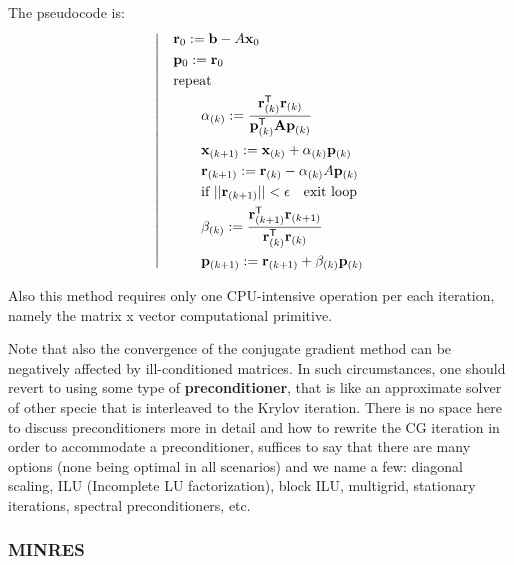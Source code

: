 \documentclass{digitaldynamics}
\def\matr#1{{#1}}
\begin{document}
The pseudocode is:
\begin{align}
\left| \quad
	\begin{aligned}
& \mathbf{r}_0 := \mathbf{b} - \matr{A} \mathbf{x}_0 \\
& \mathbf{p}_0 := \mathbf{r}_0 \\
& \text{repeat} \\
& \qquad \alpha_{(k)} := \frac{\mathbf{r}_{(k)}^\mathsf{T} \mathbf{r}_{(k)}}{\mathbf{p}_{(k)}^\mathsf{T} \mathbf{A p}_{(k)}}  \\
& \qquad \mathbf{x}_{(k+1)} := \mathbf{x}_{(k)} + \alpha_{(k)} \mathbf{p}_{(k)} \\
& \qquad \mathbf{r}_{(k+1)} := \mathbf{r}_{(k)} - \alpha_{(k)} \matr{A} \mathbf{p}_{(k)} \\
& \qquad \hbox{if } ||\mathbf{r}_{(k+1)}|| < \epsilon \quad \text{exit loop} \\
& \qquad \beta_{(k)} := \frac{\mathbf{r}_{(k+1)}^\mathsf{T} \mathbf{r}_{(k+1)}}{\mathbf{r}_{(k)}^\mathsf{T} \mathbf{r}_{(k)}} \\
& \qquad \mathbf{p}_{(k+1)} := \mathbf{r}_{(k+1)} + \beta_{(k)} \mathbf{p}_{(k)} \\
\end{aligned}
	\right.
\end{align}

Also this method requires only one CPU-intensive operation per each iteration, namely the matrix x vector computational primitive.

Note that also the convergence of the conjugate gradient method can be negatively affected by ill-conditioned matrices. In such circumstances, one should revert to using some type of \textbf{preconditioner}, that is like an approximate solver of other specie that is interleaved to the Krylov iteration. There is no space here to discuss preconditioners more in detail and how to rewrite the CG iteration in order to accommodate a preconditioner, suffices to say that there are many options (none being optimal in all scenarios) and we name a few: diagonal scaling, ILU (Incomplete LU factorization), block ILU, multigrid, stationary iterations, spectral preconditioners, etc.



\subsubsection{MINRES}
\end{document}
